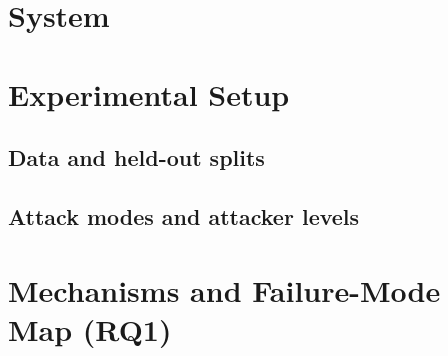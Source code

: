 \documentclass[11pt]{article}
\begin{document}
\section{System}
\label{sec:system}

\section{Experimental Setup}
\label{sec:setup}
\subsection{Data and held-out splits}
\subsection{Attack modes and attacker levels}

\section{Mechanisms and Failure-Mode Map (RQ1)}
\label{sec:map}
\end{document}
